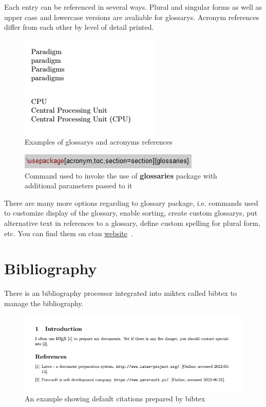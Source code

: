 Each entry can be referenced in several ways. Plural and singular forms as well as upper case and lowercase versions are avaliable for \glspl{glossary}. Acronym references differ from each other by level of detail printed.

\begin{figure}[H]
\centering
\includegraphics[scale=1.0]{content/LaTeX/figures/glossary_calls.png}
\caption{Examples of \glspl{glossary} and acronyms references}
\end{figure}

\begin{figure}[H]
\centering
\includegraphics[scale=1.0]{content/LaTeX/figures/usepackage_glossaries.png}
\caption{Command used to invoke the use of \textbf{glossaries} package with additional parameters passed to it}
\label{fig:usepackage_glossaries}
\end{figure}

There are many more options regarding to \gls{glossary} package, i.e. commands used to customize display of the \gls{glossary}, enable sorting, create custom \glspl{glossary}, put alternative text in references to a \gls{glossary}, define custom spelling for plural form, etc. You can find them on \acrshort{ctan} \href{https://www.ctan.org/pkg/glossaries}{website}~\cite{ctan_glossaries}.

\section{Bibliography}

There is an bibliography processor integrated into \Gls{miktex} called \Gls{bibtex} to manage the bibliography.

\begin{figure}[H]
\centering
\includegraphics[scale=0.75]{content/LaTeX/figures/biblio_outcome.png}
\caption{An example showing default citations prepared by \gls{bibtex}}
\label{fig:bibliography_example}
\end{figure}

